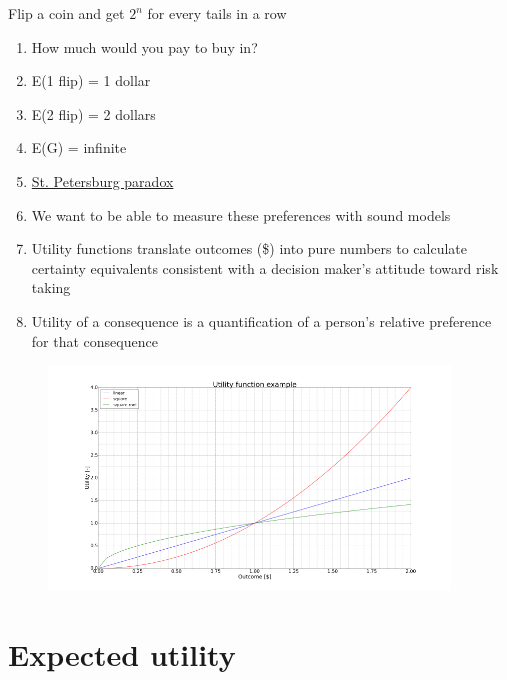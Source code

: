 \documentclass[aspectratio=1610,pdftex,dvipsnames,compress,xcolor={dvipsnames}]{beamer}
\begin{document}
\begin{frame}{Flip a coin and get $2^n$ for every tails in a row}
    \begin{enumerate}[series=outerlist,topsep=0pt,itemsep=11pt,leftmargin=*,label=(\arabic*)]
        \item[]How much would you pay to buy in?  
        \item[]E(1 flip) = 1 dollar    
        \item[]E(2 flip) = 2 dollars    
        \item[]E(G) = infinite  
        \item[]\href{https://policonomics.com/saint-petersburg-paradox/}{St. Petersburg paradox}
        \item[]We want to be able to measure these preferences with sound models
        \item[]Utility functions translate outcomes (\$) into pure numbers to calculate certainty equivalents consistent with a decision maker's attitude toward risk taking
        \item[]Utility of a consequence is a quantification of a person's relative preference for that consequence
    \end{enumerate}
\end{frame}


\begin{frame}{}
    \begin{figure}
        \centering
        \includegraphics[width=0.95\textwidth]{utility.function.example.jpg}
    \end{figure}
\end{frame}


\section{Expected utility}
\end{document}
